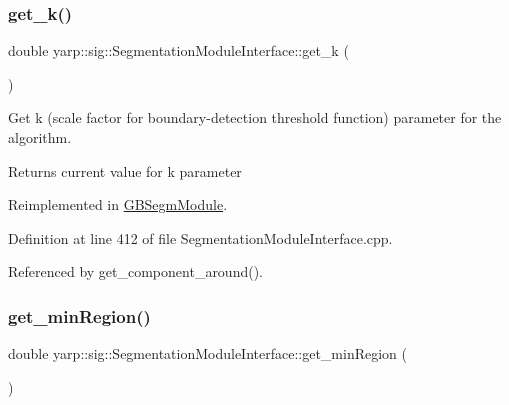 \subsubsection{\texorpdfstring{get\+\_\+k()}{get\_k()}}
{\footnotesize\ttfamily double yarp\+::sig\+::\+Segmentation\+Module\+Interface\+::get\+\_\+k (\begin{DoxyParamCaption}{ }\end{DoxyParamCaption})\hspace{0.3cm}{\ttfamily [virtual]}}



Get k (scale factor for boundary-\/detection threshold function) parameter for the algorithm. 

\begin{DoxyReturn}{Returns}
current value for k parameter 
\end{DoxyReturn}


Reimplemented in \hyperlink{classGBSegmModule_a44bab99aa7a035e57a185673c040d2f6}{G\+B\+Segm\+Module}.



Definition at line 412 of file Segmentation\+Module\+Interface.\+cpp.



Referenced by get\+\_\+component\+\_\+around().


\mbox{\label{classyarp_1_1sig_1_1SegmentationModuleInterface_a6c184aeea894f6afcc342c5aa748429d}} 
\subsubsection{\texorpdfstring{get\+\_\+min\+Region()}{get\_minRegion()}}
{\footnotesize\ttfamily double yarp\+::sig\+::\+Segmentation\+Module\+Interface\+::get\+\_\+min\+Region (\begin{DoxyParamCaption}{ }\end{DoxyParamCaption})\hspace{0.3cm}{\ttfamily [virtual]}}



